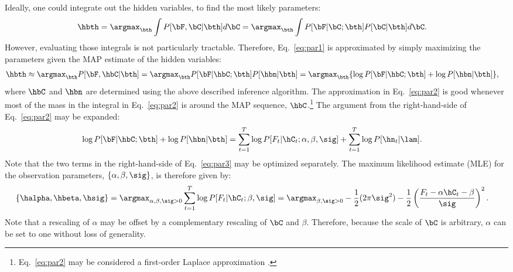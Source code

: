 Ideally, one could integrate out the hidden variables, to find the most likely parameters:
\begin{align} \label{eq:par1}
\hbth &= \argmax_{\bth} \int P[\bF, \bC | \bth] d\bC  = \argmax_{\bth} \int P[\bF | \bC; \bth] P[\bC | \bth] d\bC.
\end{align}
However, evaluating those integrals is not particularly tractable.
Therefore, Eq.~\eqref{eq:par1} is approximated by simply maximizing the parameters given the MAP estimate of the hidden variables:
\begin{align} \label{eq:par2}
\hbth &\approx \argmax_{\bth} P[\bF, \hbC | \bth] = \argmax_{\bth} P[\bF| \hbC; \bth] P[\hbn | \bth] = \argmax_{\bth} \{ \log P[\bF | \hbC; \bth] + \log P[\hbn | \bth] \}, 
\end{align}
\noindent where $\hbC$ and $\hbn$ are determined using the above described inference algorithm. The approximation in Eq.~\eqref{eq:par2} is good whenever most of the mass in the integral in Eq.~\eqref{eq:par2} is around the MAP sequence, $\hbC$.\footnote{Eq.~\eqref{eq:par2} may be considered a first-order Laplace approximation \cite{KassRaftery95}.}  The argument from the right-hand-side of Eq.~\eqref{eq:par2} may be expanded: 
\begin{align} \label{eq:par3}
\log P[\bF| \hbC; \bth] + \log P[\hbn | \bth] &= \sum_{t=1}^T \log P[F_t | \hC_t; \alpha, \beta,\sig] + \sum_{t=1}^T \log P[\hn_t | \lam].
\end{align}
\noindent Note that the two terms in the right-hand-side of Eq.~\eqref{eq:par3} may be optimized separately.  The maximum likelihood estimate (MLE) for the observation parameters, $\{\alpha,\beta,\sig\}$, is therefore given by:
\begin{align} \label{eq:beta,sig}
	\{\halpha, \hbeta,\hsig\} &=  \argmax_{\alpha, \beta,\sig >0} \sum_{t=1}^T \log P[F_t | \hC_t; \beta,\sig]
	=  \argmax_{\beta,\sig >0} 	-\frac{1}{2} (2\pi \sig^2) - \frac{1}{2} \left(\frac{F_t-\alpha \hC_t -\beta}{\sig}\right)^2. %
\end{align}
Note that a rescaling of $\alpha$ may be offset by a complementary rescaling of $\bC$ and $\beta$.  Therefore, because the scale of $\bC$ is arbitrary, $\alpha$ can be set to one without loss of generality.  
